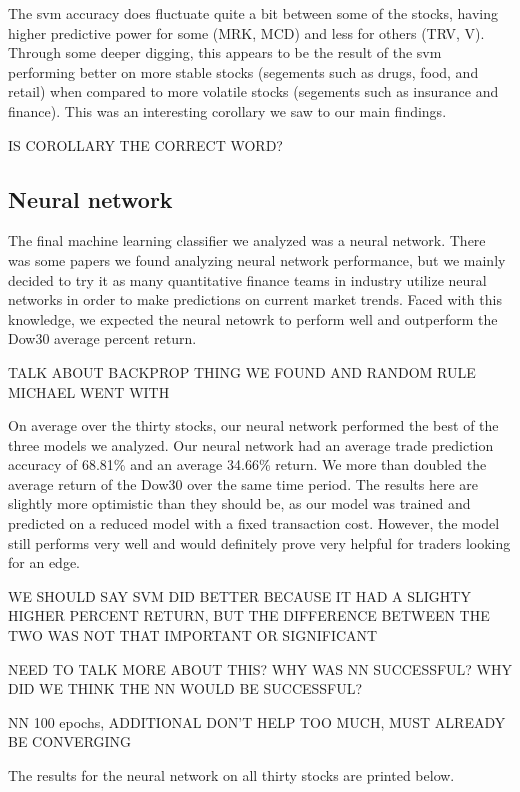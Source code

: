 \documentclass{article}
\begin{document}
The svm accuracy does fluctuate quite a bit between some of the stocks, having higher predictive power for some (MRK, MCD) and less for others (TRV, V). Through some deeper digging, this appears to be the result of the svm performing better on more stable stocks (segements such as drugs, food, and retail) when compared to more volatile stocks (segements such as insurance and finance). This was an interesting corollary we saw to our main findings.

IS COROLLARY THE CORRECT WORD?

\subsection{Neural network}
The final machine learning classifier we analyzed was a neural network. There was some papers we found analyzing neural network performance, but we mainly decided to try it as many quantitative finance teams in industry utilize neural networks in order to make predictions on current market trends. Faced with this knowledge, we expected the neural netowrk to perform well and outperform the Dow30 average percent return.

TALK ABOUT BACKPROP THING WE FOUND AND RANDOM RULE MICHAEL WENT WITH

On average over the thirty stocks, our neural network performed the best of the three models we analyzed. Our neural network had an average trade prediction accuracy of 68.81\% and an average 34.66\% return. We more than doubled the average return of the Dow30 over the same time period. The results here are slightly more optimistic than they should be, as our model was trained and predicted on a reduced model with a fixed transaction cost. However, the model still performs very well and would definitely prove very helpful for traders looking for an edge.

WE SHOULD SAY SVM DID BETTER BECAUSE IT HAD A SLIGHTY HIGHER PERCENT RETURN, BUT THE DIFFERENCE BETWEEN THE TWO WAS NOT THAT IMPORTANT OR SIGNIFICANT

NEED TO TALK MORE ABOUT THIS? WHY WAS NN SUCCESSFUL? WHY DID WE THINK THE NN WOULD BE SUCCESSFUL?

NN 100 epochs, ADDITIONAL DON'T HELP TOO MUCH, MUST ALREADY BE CONVERGING

The results for the neural network on all thirty stocks are printed below.
\end{document}
